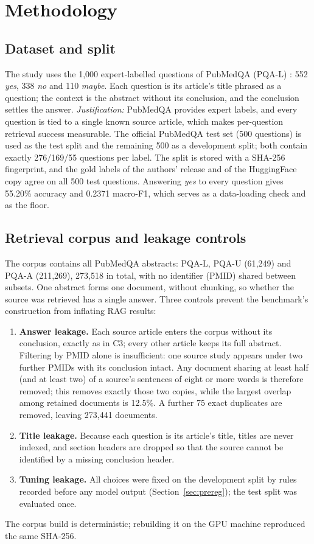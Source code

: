\documentclass[conference]{IEEEtran}
\begin{document}
\section{Methodology}

\subsection{Dataset and split}
The study uses the 1{,}000 expert-labelled questions of PubMedQA (PQA-L)
\cite{jin2019pubmedqa}: 552 \emph{yes}, 338 \emph{no} and 110 \emph{maybe}. Each
question is its article's title phrased as a question; the context is the
abstract without its conclusion, and the conclusion settles the answer.
\emph{Justification:} PubMedQA provides expert labels, and every question is tied
to a single known source article, which makes per-question retrieval success
measurable. The official PubMedQA test set (500 questions) is used as the test
split and the remaining 500 as a development split; both contain exactly
276/169/55 questions per label. The split is stored with a SHA-256 fingerprint,
and the gold labels of the authors' release and of the HuggingFace copy agree on
all 500 test questions. Answering \emph{yes} to every question gives 55.20\%
accuracy and 0.2371 macro-F1, which serves as a data-loading check and as the
floor.

\subsection{Retrieval corpus and leakage controls}
The corpus contains all PubMedQA abstracts: PQA-L, PQA-U (61{,}249) and PQA-A
(211{,}269), 273{,}518 in total, with no identifier (PMID) shared between
subsets. One abstract forms one document, without chunking, so whether the
source was retrieved has a single answer. Three controls prevent the benchmark's
construction from inflating RAG results:

\begin{enumerate}
\item \textbf{Answer leakage.} Each source article enters the corpus without its
conclusion, exactly as in C3; every other article keeps its full abstract.
Filtering by PMID alone is insufficient: one source study appears under two
further PMIDs with its conclusion intact. Any document sharing at least half (and
at least two) of a source's sentences of eight or more words is therefore
removed; this removes exactly those two copies, while the largest overlap among
retained documents is 12.5\%. A further 75 exact duplicates are removed, leaving
273{,}441 documents.
\item \textbf{Title leakage.} Because each question is its article's title,
titles are never indexed, and section headers are dropped so that the source
cannot be identified by a missing conclusion header.
\item \textbf{Tuning leakage.} All choices were fixed on the development split by
rules recorded before any model output (Section~\ref{sec:prereg}); the test
split was evaluated once.
\end{enumerate}
The corpus build is deterministic; rebuilding it on the GPU machine reproduced
the same SHA-256.
\end{document}

